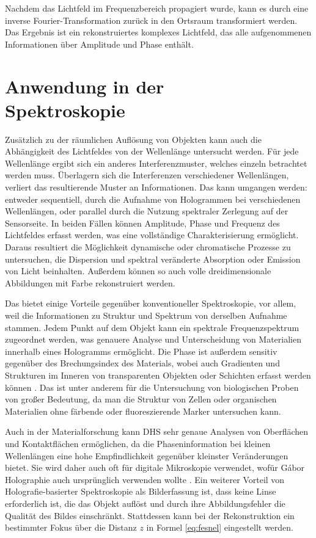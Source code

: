 \documentclass[10pt,twocolumn,a4paper]{article}
\begin{document}
Nachdem das Lichtfeld im Frequenzbereich propagiert wurde, kann es durch eine inverse Fourier-Transformation zurück in den Ortsraum transformiert werden. Das Ergebnis ist ein rekonstruiertes komplexes Lichtfeld, das alle aufgenommenen Informationen über Amplitude und Phase enthält.

\section{Anwendung in der \\Spektroskopie}
Zusätzlich zu der räumlichen Auflösung von Objekten kann auch die Abhängigkeit des Lichtfeldes von der Wellenlänge untersucht werden. Für jede Wellenlänge ergibt sich ein anderes Interferenzmuster, welches einzeln betrachtet werden muss. Überlagern sich die Interferenzen verschiedener Wellenlängen, verliert das resultierende Muster an Informationen. Das kann umgangen werden: entweder sequentiell, durch die Aufnahme von Hologrammen bei verschiedenen Wellenlängen, oder parallel durch die Nutzung spektraler Zerlegung auf der Sensorseite. In beiden Fällen können Amplitude, Phase und Frequenz des Lichtfeldes erfasst werden, was eine vollständige Charakterisierung ermöglicht. 
Daraus resultiert die Möglichkeit dynamische oder chromatische Prozesse zu untersuchen, die Dispersion und spektral veränderte Absorption oder Emission von Licht beinhalten. Außerdem können so auch volle dreidimensionale Abbildungen mit Farbe rekonstruiert werden.

Das bietet einige Vorteile gegenüber konventioneller Spektroskopie, vor allem, weil die Informationen zu Struktur und Spektrum von derselben Aufnahme stammen. Jedem Punkt auf dem Objekt kann ein spektrale Frequenzspektrum zugeordnet werden, was genauere Analyse und Unterscheidung von Materialien innerhalb eines Hologramms ermöglicht. Die Phase ist außerdem sensitiv gegenüber des Brechungsindex des Materials, wobei auch Gradienten und Strukturen im Inneren von transparenten Objekten oder Schichten erfasst werden können \cite{industrial}. Das ist unter anderem für die Untersuchung von biologischen Proben von großer Bedeutung, da man die Struktur von Zellen oder organischen Materialien ohne färbende oder fluoreszierende Marker untersuchen kann. 

Auch in der Materialforschung kann DHS sehr genaue Analysen von Oberflächen und Kontaktflächen ermöglichen, da die Phaseninformation bei kleinen Wellenlängen eine hohe Empfindlichkeit gegenüber kleinster Veränderungen bietet. Sie wird daher auch oft für digitale Mikroskopie verwendet, wofür Gábor Holographie auch ursprünglich verwenden wollte \cite{DHM}. Ein weiterer Vorteil von Holografie-basierter Spektroskopie als Bilderfassung ist, dass keine Linse erforderlich ist, die das Objekt auflöst und durch ihre Abbildungsfehler die Qualität des Bildes einschränkt. Stattdessen kann bei der Rekonstruktion ein bestimmter Fokus über die Distanz $z$ in Formel \ref{eq:fesnel} eingestellt werden.
\end{document}
